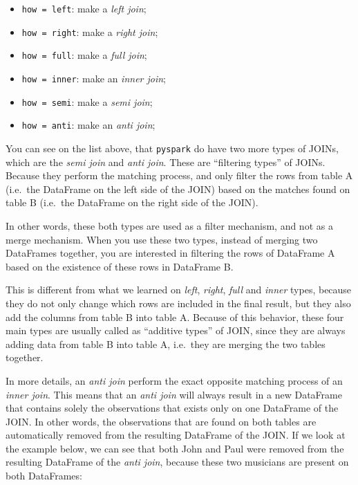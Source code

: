 \documentclass[
  11pt,
  letterpaper,
  DIV=11,
  numbers=noendperiod]{scrreprt}
\providecommand{\tightlist}{%
  \setlength{\itemsep}{0pt}\setlength{\parskip}{0pt}}\usepackage{longtable,booktabs,array}
\begin{document}
\begin{itemize}
\tightlist
\item
  \texttt{how\ =\ \textquotesingle{}left\textquotesingle{}}: make a
  \emph{left join};
\item
  \texttt{how\ =\ \textquotesingle{}right\textquotesingle{}}: make a
  \emph{right join};
\item
  \texttt{how\ =\ \textquotesingle{}full\textquotesingle{}}: make a
  \emph{full join};
\item
  \texttt{how\ =\ \textquotesingle{}inner\textquotesingle{}}: make an
  \emph{inner join};
\item
  \texttt{how\ =\ \textquotesingle{}semi\textquotesingle{}}: make a
  \emph{semi join};
\item
  \texttt{how\ =\ \textquotesingle{}anti\textquotesingle{}}: make an
  \emph{anti join};
\end{itemize}

You can see on the list above, that \texttt{pyspark} do have two more
types of JOINs, which are the \emph{semi join} and \emph{anti join}.
These are ``filtering types'' of JOINs. Because they perform the
matching process, and only filter the rows from table A (i.e.~the
DataFrame on the left side of the JOIN) based on the matches found on
table B (i.e.~the DataFrame on the right side of the JOIN).

In other words, these both types are used as a filter mechanism, and not
as a merge mechanism. When you use these two types, instead of merging
two DataFrames together, you are interested in filtering the rows of
DataFrame A based on the existence of these rows in DataFrame B.

This is different from what we learned on \emph{left}, \emph{right},
\emph{full} and \emph{inner} types, because they do not only change
which rows are included in the final result, but they also add the
columns from table B into table A. Because of this behavior, these four
main types are usually called as ``additive types'' of JOIN, since they
are always adding data from table B into table A, i.e.~they are merging
the two tables together.

In more details, an \emph{anti join} perform the exact opposite matching
process of an \emph{inner join}. This means that an \emph{anti join}
will always result in a new DataFrame that contains solely the
observations that exists only on one DataFrame of the JOIN. In other
words, the observations that are found on both tables are automatically
removed from the resulting DataFrame of the JOIN. If we look at the
example below, we can see that both John and Paul were removed from the
resulting DataFrame of the \emph{anti join}, because these two musicians
are present on both DataFrames:
\end{document}
